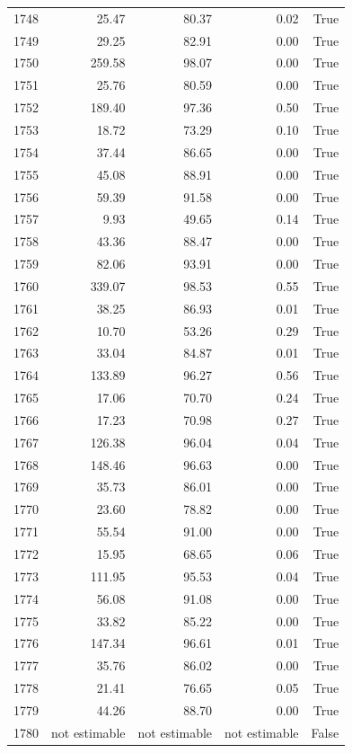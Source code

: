\begin{longtable}{rrrrr}
1748 & 25.47 & 80.37 & 0.02 & True \\
1749 & 29.25 & 82.91 & 0.00 & True \\
1750 & 259.58 & 98.07 & 0.00 & True \\
1751 & 25.76 & 80.59 & 0.00 & True \\
1752 & 189.40 & 97.36 & 0.50 & True \\
1753 & 18.72 & 73.29 & 0.10 & True \\
1754 & 37.44 & 86.65 & 0.00 & True \\
1755 & 45.08 & 88.91 & 0.00 & True \\
1756 & 59.39 & 91.58 & 0.00 & True \\
1757 & 9.93 & 49.65 & 0.14 & True \\
1758 & 43.36 & 88.47 & 0.00 & True \\
1759 & 82.06 & 93.91 & 0.00 & True \\
1760 & 339.07 & 98.53 & 0.55 & True \\
1761 & 38.25 & 86.93 & 0.01 & True \\
1762 & 10.70 & 53.26 & 0.29 & True \\
1763 & 33.04 & 84.87 & 0.01 & True \\
1764 & 133.89 & 96.27 & 0.56 & True \\
1765 & 17.06 & 70.70 & 0.24 & True \\
1766 & 17.23 & 70.98 & 0.27 & True \\
1767 & 126.38 & 96.04 & 0.04 & True \\
1768 & 148.46 & 96.63 & 0.00 & True \\
1769 & 35.73 & 86.01 & 0.00 & True \\
1770 & 23.60 & 78.82 & 0.00 & True \\
1771 & 55.54 & 91.00 & 0.00 & True \\
1772 & 15.95 & 68.65 & 0.06 & True \\
1773 & 111.95 & 95.53 & 0.04 & True \\
1774 & 56.08 & 91.08 & 0.00 & True \\
1775 & 33.82 & 85.22 & 0.00 & True \\
1776 & 147.34 & 96.61 & 0.01 & True \\
1777 & 35.76 & 86.02 & 0.00 & True \\
1778 & 21.41 & 76.65 & 0.05 & True \\
1779 & 44.26 & 88.70 & 0.00 & True \\
1780 & not estimable & not estimable & not estimable & False \\

\end{longtable}
